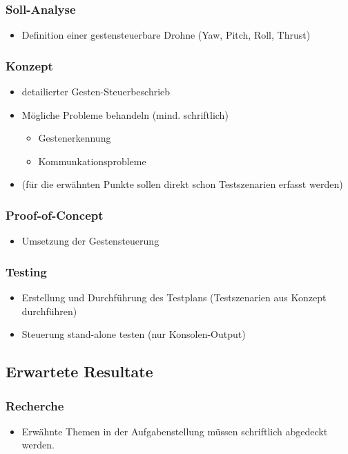 \subsubsection{Soll-Analyse}
\begin{itemize}
	\item Definition einer gestensteuerbare Drohne (Yaw, Pitch, Roll, Thrust)
\end{itemize}


\subsubsection{Konzept}
\begin{itemize}
	\item detailierter Gesten-Steuerbeschrieb
	\item Mögliche Probleme behandeln (mind. schriftlich)
	\begin{itemize}
		\item Gestenerkennung
		\item Kommunkationsprobleme
	\end{itemize}
	\item (für die erwähnten Punkte sollen direkt schon Testszenarien erfasst werden)
\end{itemize}


\subsubsection{Proof-of-Concept}
\begin{itemize}
	\item Umsetzung der Gestensteuerung
\end{itemize}


\subsubsection{Testing}
\begin{itemize}
	\item Erstellung und Durchführung des Testplans (Testszenarien aus Konzept durchführen)
	\item Steuerung stand-alone testen (nur Konsolen-Output)
\end{itemize}

\subsection{Erwartete Resultate}
\subsubsection{Recherche}
\begin{itemize}
	\item Erwähnte Themen in der Aufgabenstellung müssen schriftlich abgedeckt werden.
\end{itemize}

